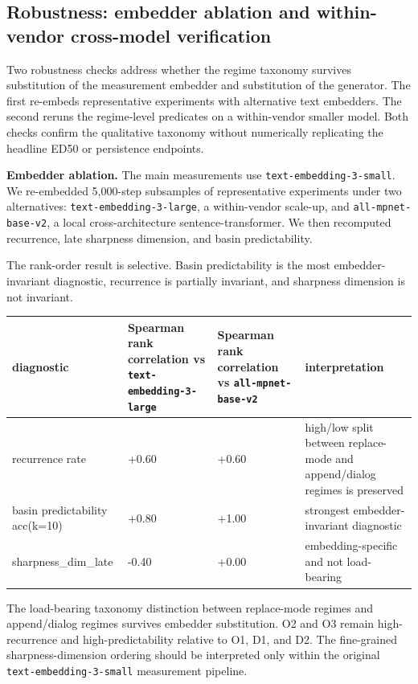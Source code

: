 \documentclass{article}
\theoremstyle{plain}
\theoremstyle{definition}
\begin{document}
\subsection{Robustness: embedder ablation and within-vendor cross-model verification}

Two robustness checks address whether the regime taxonomy survives substitution of the measurement embedder and substitution of the generator. The first re-embeds representative experiments with alternative text embedders. The second reruns the regime-level predicates on a within-vendor smaller model. Both checks confirm the qualitative taxonomy without numerically replicating the headline ED50 or persistence endpoints.

\textbf{Embedder ablation.} The main measurements use \texttt{text-embedding-3-small}. We re-embedded 5,000-step subsamples of representative experiments under two alternatives: \texttt{text-embedding-3-large}, a within-vendor scale-up, and \texttt{all-mpnet-base-v2}, a local cross-architecture sentence-transformer. We then recomputed recurrence, late sharpness dimension, and basin predictability.

The rank-order result is selective. Basin predictability is the most embedder-invariant diagnostic, recurrence is partially invariant, and sharpness dimension is not invariant.

\begin{table}[h!]
\centering
\small
\begin{tabularx}{\textwidth}{lYYY}
\toprule
diagnostic & Spearman rank correlation vs \texttt{text-embedding-3-large} & Spearman rank correlation vs \texttt{all-mpnet-base-v2} & interpretation \\
\midrule
recurrence rate & +0.60 & +0.60 & high/low split between replace-mode and append/dialog regimes is preserved \\
basin predictability acc(k=10) & +0.80 & +1.00 & strongest embedder-invariant diagnostic \\
sharpness\_dim\_late & -0.40 & +0.00 & embedding-specific and not load-bearing \\
\bottomrule
\end{tabularx}
\end{table}

The load-bearing taxonomy distinction between replace-mode regimes and append/dialog regimes survives embedder substitution. O2 and O3 remain high-recurrence and high-predictability relative to O1, D1, and D2. The fine-grained sharpness-dimension ordering should be interpreted only within the original \texttt{text-embedding-3-small} measurement pipeline.
\end{document}
